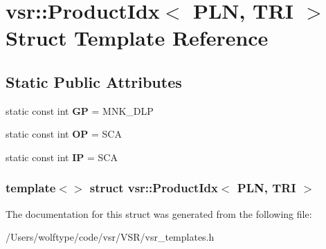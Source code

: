 \hypertarget{structvsr_1_1_product_idx_3_01_p_l_n_00_01_t_r_i_01_4}{\section{vsr\-:\-:Product\-Idx$<$ P\-L\-N, T\-R\-I $>$ Struct Template Reference}
\label{structvsr_1_1_product_idx_3_01_p_l_n_00_01_t_r_i_01_4}
}
\subsection*{Static Public Attributes}
\begin{DoxyCompactItemize}
\item 
\hypertarget{structvsr_1_1_product_idx_3_01_p_l_n_00_01_t_r_i_01_4_aa8036394fbf9f9aaf5e52d92f20b9419}{static const int {\bfseries G\-P} = M\-N\-K\-\_\-\-D\-L\-P}\label{structvsr_1_1_product_idx_3_01_p_l_n_00_01_t_r_i_01_4_aa8036394fbf9f9aaf5e52d92f20b9419}

\item 
\hypertarget{structvsr_1_1_product_idx_3_01_p_l_n_00_01_t_r_i_01_4_a5e40c5063d7fbdc0827f1f1d56ceef50}{static const int {\bfseries O\-P} = S\-C\-A}\label{structvsr_1_1_product_idx_3_01_p_l_n_00_01_t_r_i_01_4_a5e40c5063d7fbdc0827f1f1d56ceef50}

\item 
\hypertarget{structvsr_1_1_product_idx_3_01_p_l_n_00_01_t_r_i_01_4_a70f1e80e368a368c74f37bca057b735c}{static const int {\bfseries I\-P} = S\-C\-A}\label{structvsr_1_1_product_idx_3_01_p_l_n_00_01_t_r_i_01_4_a70f1e80e368a368c74f37bca057b735c}

\end{DoxyCompactItemize}
\subsubsection*{template$<$$>$ struct vsr\-::\-Product\-Idx$<$ P\-L\-N, T\-R\-I $>$}



The documentation for this struct was generated from the following file\-:\begin{DoxyCompactItemize}
\item 
/\-Users/wolftype/code/vsr/\-V\-S\-R/vsr\-\_\-templates.\-h\end{DoxyCompactItemize}
